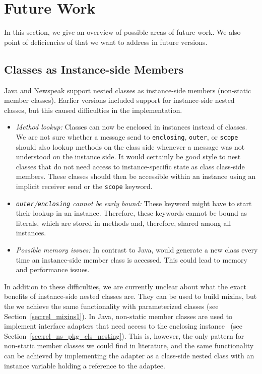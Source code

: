 \chapter{Future Work}
\label{sec:future}
In this section, we give an overview of possible areas of future work. We also point of deficiencies of \msname that we want to address in future versions.

\section{Classes as Instance-side Members}
\label{sec:future_inst_side}
Java and Newspeak support nested classes as instance-side members (non-static member classes). Earlier versions \msname included support for instance-side nested classes, but this caused difficulties in the implementation. 

\begin{itemize}
	\item \emph{Method lookup:} Classes can now be enclosed in instances instead of classes. We are not sure whether a message send to \texttt{enclosing}, \texttt{outer}, or \texttt{scope} should also lookup methods on the class side whenever a message was not understood on the instance side. It would certainly be good style to nest classes that do not need access to instance-specific state as class class-side members. These classes should then be accessible within an instance using an implicit receiver send or the \texttt{scope} keyword.
	\item \emph{\texttt{outer}/\texttt{enclosing} cannot be early bound:} These keyword might have to start their lookup in an instance. Therefore, these keywords cannot be bound as literals, which are stored in methods and, therefore, shared among all instances.
	\item \emph{Possible memory issues:} In contrast to Java, \msname would generate a new class every time an instance-side member class is accessed. This could lead to memory and performance issues.
\end{itemize}

In addition to these difficulties, we are currently unclear about what the exact benefits of instance-side nested classes are. They can be used to build mixins, but the we achieve the same functionality with parameterized classes (see Section~\ref{sec:rel_mixins1}). In Java, non-static member classes are used to implement interface adapters that need access to the enclosing instance~\cite{Bloch:2008:EJ:1377533} (see Section~\ref{sec:rel_ns_pkg_cls_nesting}). This is, however, the only pattern for non-static member classes we could find in literature, and the same functionality can be achieved by implementing the adapter as a class-side nested class with an instance variable holding a reference to the adaptee.

